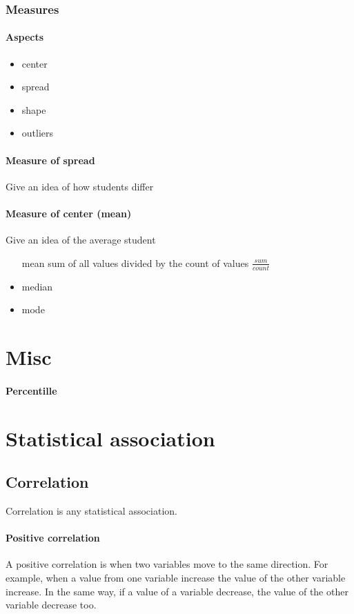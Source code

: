 \documentclass[]{article}
\begin{document}
\subsubsection{Measures}
\paragraph{Aspects}
\begin{itemize}
\item center
\item spread
\item shape
\item outliers
\end{itemize}
\paragraph{Measure of spread}

Give an idea of how students differ
\paragraph{Measure of center (mean)}
Give an idea of the average student
\begin{itemize}
	\item[mean] sum of all values divided by the count of values $ \frac{sum}{count} $
	\item median
	\item mode
\end{itemize}


\section{Misc}

\paragraph{Percentille}

\section{Statistical association}

\subsection{Correlation}

Correlation is any statistical association.

\paragraph{Positive correlation}
A positive correlation is when two variables move to the same direction. For example, when a value from 
one variable increase the value of the other variable increase. In the same way, if a value of a variable
decrease, the value of the other variable decrease too.
\end{document}
